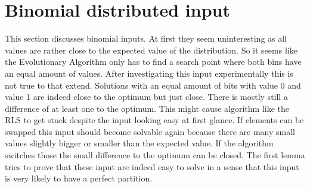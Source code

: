 
\section{Binomial distributed input}
This section discusses binomial inputs.
At first they seem uninteresting as all values are rather close to the expected value of the distribution.
So it seems like the Evolutionary Algorithm only has to find a search point where both bins have an equal amount of values.
After investigating this input experimentally this is not true to that extend.
Solutions with an equal amount of bits with value 0 and value 1 are indeed close to the optimum but just close.
There is mostly still a difference of at least one to the optimum.
This might cause algorithm like the RLS to get stuck despite the input looking easy at first glance.
If elements can be swapped this input should become solvable again because there are many small values slightly bigger or smaller than the expected value.
If the algorithm switches those the small difference to the optimum can be closed.
The first lemma tries to prove that these input are indeed easy to solve in a sense that this input is very likely to have a perfect partition.

